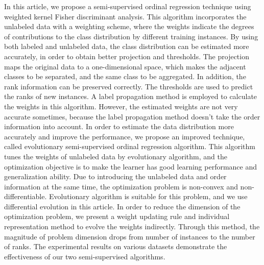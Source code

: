 \begin{enabstract}
In this article, we propose a semi-supervised ordinal regression technique using weighted kernel Fisher discriminant analysis. This algorithm incorporates the unlabeled data with a weighting scheme, where the weights indicate the degrees of contributions to the class distribution by different training instances. By using both labeled and unlabeled data, the class distribution can be estimated more accurately, in order to obtain better projection and thresholds. The projection maps the original data to a one-dimensional space, which makes the adjacent classes to be separated, and the same class to be aggregated. In addition, the rank information can be preserved correctly. The thresholds are used to predict the ranks of new instances. A label propagation method is employed to calculate the weights in this algorithm. However, the estimated weights are not very accurate sometimes, because the label propagation method doesn't take the order information into account. In order to estimate the data distribution more accurately and improve the performance, we propose an improved technique, called evolutionary semi-supervised ordinal regression algorithm. This algorithm tunes the weights of unlabeled data by evolutionary algorithm, and the optimization objective is to make the learner has good learning performance and generalization ability. Due to introducing the unlabeled data and order information at the same time, the optimization problem is non-convex and non-differentiable. Evolutionary algorithm is suitable for this problem, and we use differential evolution in this article. In order to reduce the dimension of the optimization problem, we present a weight updating rule and individual representation method to evolve the weights indirectly. Through this method, the magnitude of problem dimension drops from number of instances to the number of ranks. The experimental results on various datasets demonstrate the effectiveness of our two semi-supervised algorithms. 


\end{enabstract}
